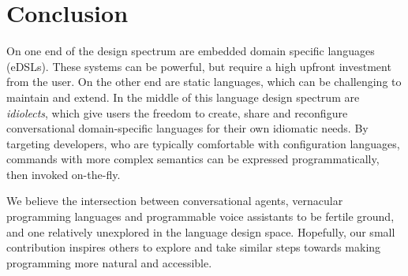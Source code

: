 \documentclass{article}
\theoremstyle{plain}
\theoremstyle{definition}
\theoremstyle{remark}
\begin{document}
%
%

\section{Conclusion}

On one end of the design spectrum are embedded domain specific languages (eDSLs). These systems can be powerful, but require a high upfront investment from the user. On the other end are static languages, which can be challenging to maintain and extend. In the middle of this language design spectrum are \textit{idiolects}, which give users the freedom to create, share and reconfigure conversational domain-specific languages for their own idiomatic needs. By targeting developers, who are typically comfortable with configuration languages, commands with more complex semantics can be expressed programmatically, then invoked on-the-fly.

We believe the intersection between conversational agents, vernacular programming languages and programmable voice assistants to be fertile ground, and one relatively unexplored in the language design space. Hopefully, our small contribution inspires others to explore and take similar steps towards making programming more natural and accessible.

\nocite{langley00}



\end{document}
